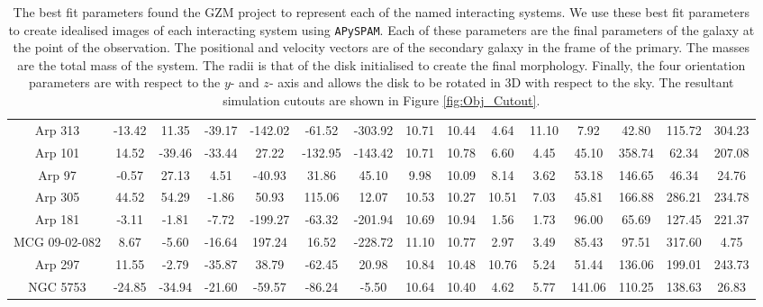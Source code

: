 \begin{table}
{\begin{tabular}{|c|c|c|c|c|c|c|c|c|c|c|c|c|c|c|}
Arp 313 & -13.42 & 11.35 & -39.17 & -142.02 & -61.52 & -303.92 & 10.71 & 10.44 & 4.64 & 11.10 & 7.92 & 42.80 & 115.72 & 304.23 \\
Arp 101 & 14.52 & -39.46 & -33.44 & 27.22 & -132.95 & -143.42 & 10.71 & 10.78 & 6.60 & 4.45 & 45.10 & 358.74 & 62.34 & 207.08 \\
Arp 97 & -0.57 & 27.13 & 4.51 & -40.93 & 31.86 & 45.10 & 9.98 & 10.09 & 8.14 & 3.62 & 53.18 & 146.65 & 46.34 & 24.76 \\
Arp 305 & 44.52 & 54.29 & -1.86 & 50.93 & 115.06 & 12.07 & 10.53 & 10.27 & 10.51 & 7.03 & 45.81 & 166.88 & 286.21 & 234.78 \\
Arp 181 & -3.11 & -1.81 & -7.72 & -199.27 & -63.32 & -201.94 & 10.69 & 10.94 & 1.56 & 1.73 & 96.00 & 65.69 & 127.45 & 221.37 \\
MCG 09-02-082 & 8.67 & -5.60 & -16.64 & 197.24 & 16.52 & -228.72 & 11.10 & 10.77 & 2.97 & 3.49 & 85.43 & 97.51 & 317.60 & 4.75 \\
Arp 297 & 11.55 & -2.79 & -35.87 & 38.79 & -62.45 & 20.98 & 10.84 & 10.48 & 10.76 & 5.24 & 51.44 & 136.06 & 199.01 & 243.73 \\
NGC 5753 & -24.85 & -34.94 & -21.60 & -59.57 & -86.24 & -5.50 & 10.64 & 10.40 & 4.62 & 5.77 & 141.06 & 110.25 & 138.63 & 26.83 \\
\hline
\end{tabular}}
\caption{The best fit parameters found the GZM project to represent each of the named interacting systems. We use these best fit parameters to create idealised images of each interacting system using \texttt{APySPAM}. Each of these parameters are the final parameters of the galaxy at the point of the observation. The positional and velocity vectors are of the secondary galaxy in the frame of the primary. The masses are the total mass of the system. The radii is that of the disk initialised to create the final morphology. Finally, the four orientation parameters are with respect to the $y$- and $z$- axis and allows the disk to be rotated in 3D with respect to the sky. The resultant simulation cutouts are shown in Figure \ref{fig:Obj_Cutout}.}
\label{tab:Objects}
\end{table}

